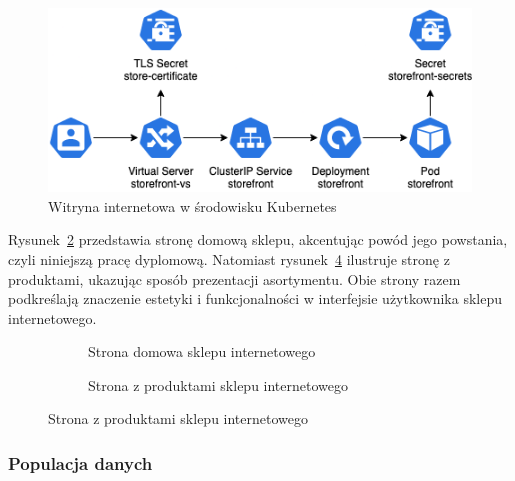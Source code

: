 \begin{figure}[H]
    \centering
    \includegraphics[width=\textwidth]{img/kubernetes-storefront}
    \caption{Witryna internetowa w środowisku Kubernetes}
    \label{fig:kubernetes-storefront}
\end{figure}

Rysunek~\ref{fig:storefront-homepage} przedstawia stronę domową sklepu, akcentując powód jego powstania, czyli niniejszą pracę dyplomową.
Natomiast rysunek~\ref{fig:storefront-products} ilustruje stronę z produktami, ukazując sposób prezentacji asortymentu.
Obie strony razem podkreślają znaczenie estetyki i funkcjonalności w interfejsie użytkownika sklepu internetowego.

\begin{figure}[p]
    \begin{figure}[H]
        \centering
        \caption{Strona domowa sklepu internetowego}
        \label{fig:storefront-homepage}
    \end{figure}

    \begin{figure}[H]
        \centering
        \caption{Strona z produktami sklepu internetowego}
        \label{fig:storefront-products}
    \end{figure}
\end{figure}

\subsubsection{Populacja danych}

